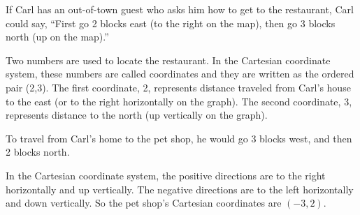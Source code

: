 \documentclass{ximera}
\begin{document}
If Carl has an out-of-town guest who asks him how to get to the restaurant, Carl could say, ``First go 2 blocks east (to the right on the map), then go 3 blocks north (up on the map).''

Two numbers are used to locate the restaurant. In the Cartesian coordinate system, these numbers are called coordinates and they are written as the ordered pair (2,3). The first coordinate, 2, represents distance traveled from Carl's house to the east (or to the right horizontally on the graph). The second coordinate, 3, represents distance to the north (up vertically on the graph).

\begin{image} 
\end{image}

To travel from Carl's home to the pet shop, he would go 3 blocks west, and then 2 blocks north.

In the Cartesian coordinate system, the positive directions are to the right horizontally and up vertically. The negative directions are to the left horizontally and down vertically. So the pet shop's Cartesian coordinates are $(-3,2)$.
\end{document}
